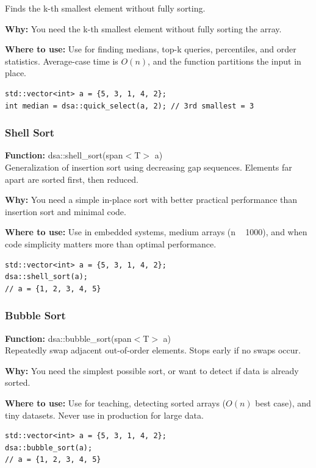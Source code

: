 \documentclass[11pt]{article}
\begin{document}
Finds the k-th smallest element without fully sorting.

\textbf{Why:} You need the k-th smallest element without fully sorting the array. \par \textbf{Where to use:} Use for finding medians, top-k queries, percentiles, and order statistics. Average-case time is \(O(n)\), and the function partitions the input in place.

\begin{lstlisting}
std::vector<int> a = {5, 3, 1, 4, 2};
int median = dsa::quick_select(a, 2); // 3rd smallest = 3
\end{lstlisting}

\subsubsection{Shell Sort}
\textbf{Function:} dsa::shell\_sort(span$<$T$>$ a)\\

Generalization of insertion sort using decreasing gap sequences. Elements far apart are sorted first, then reduced.

\textbf{Why:} You need a simple in-place sort with better practical performance than insertion sort and minimal code. \par \textbf{Where to use:} Use in embedded systems, medium arrays (n ~ 1000), and when code simplicity matters more than optimal performance.

\begin{lstlisting}
std::vector<int> a = {5, 3, 1, 4, 2};
dsa::shell_sort(a);
// a = {1, 2, 3, 4, 5}
\end{lstlisting}

\subsubsection{Bubble Sort}
\textbf{Function:} dsa::bubble\_sort(span$<$T$>$ a)\\

Repeatedly swap adjacent out-of-order elements. Stops early if no swaps occur.

\textbf{Why:} You need the simplest possible sort, or want to detect if data is already sorted. \par \textbf{Where to use:} Use for teaching, detecting sorted arrays (\(O(n)\) best case), and tiny datasets. Never use in production for large data.

\begin{lstlisting}
std::vector<int> a = {5, 3, 1, 4, 2};
dsa::bubble_sort(a);
// a = {1, 2, 3, 4, 5}
\end{lstlisting}
\end{document}
